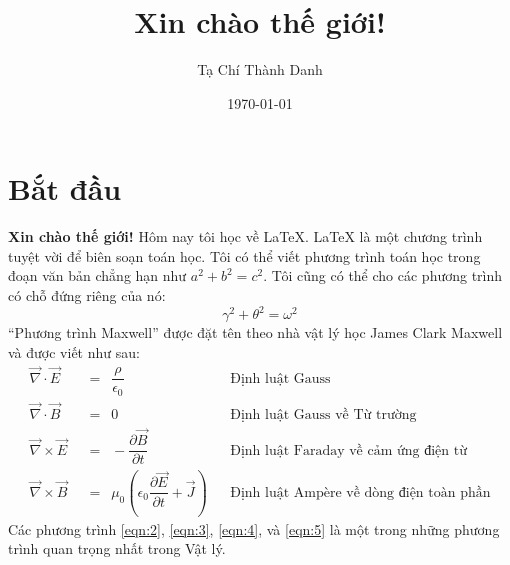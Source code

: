 \documentclass[a4paper,notitlepage]{article}
\title{Xin chào thế giới!}
\author{Tạ Chí Thành Danh}
\date{\today}
\begin{document}
	\maketitle
	\section{Bắt đầu}
	\textbf{Xin chào thế giới!} Hôm nay tôi học về \LaTeX. \LaTeX{} là một chương trình tuyệt vời để biên soạn toán học. Tôi có thể viết phương trình toán học trong đoạn văn bản chẳng hạn như $a^2 + b^2 = c^2$. Tôi cũng có thể cho các phương trình có chỗ đứng riêng của nó:
	\begin{equation}
		\gamma^2 + \theta^2 = \omega^2
	\end{equation}
	``Phương trình Maxwell'' được đặt tên theo nhà vật lý học James Clark Maxwell và được viết như sau:
	\begin{align} 
		\vec\nabla \cdot \vec E \enspace &= \enspace \dfrac{\rho}{\epsilon_0} && \text{Định luật Gauss} \label{eqn:2} \\
		\vec\nabla \cdot \vec B \enspace &= \enspace 0 && \text{Định luật Gauss về Từ trường} \label{eqn:3} \\
		\vec\nabla \times \vec E \enspace &= \enspace -\dfrac{\partial \vec B}{\partial t} && \text{Định luật Faraday về cảm ứng điện từ} \label{eqn:4} \\
		\vec\nabla \times \vec B \enspace &= \enspace \mu_0 \left(\epsilon_0 \dfrac{\partial \vec E}{\partial t} + \vec J\right) && \text{Định luật Ampère về dòng điện toàn phần} \label{eqn:5}
	\end{align}
	Các phương trình \ref{eqn:2}, \ref{eqn:3}, \ref{eqn:4}, và \ref{eqn:5} là một trong những phương trình quan trọng nhất trong Vật lý.
\end{document}
